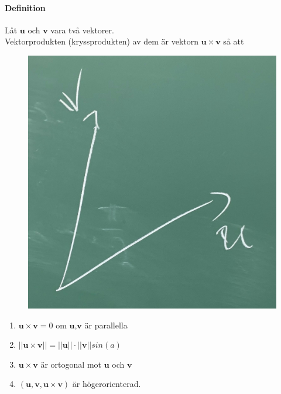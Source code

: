 \paragraph{Definition} Låt $\bm{u}$ och $\bm{v}$ vara två vektorer.\\
Vektorprodukten (kryssprodukten) av dem är vektorn $\bm{u}\times \bm{v}$ så att
\begin{figure}
    \vspace{-10pt}
    \centering
    \includegraphics[scale=0.07]{imgs/22-01-20-img09.jpg}
\end{figure}
\vspace{-10pt}
\begin{enumerate}
    \item $\bm{u}\times \bm{v} = 0$ om $\bm{u}$,$\bm{v}$ är parallella
    \item $||\bm{u}\times \bm{v}||=||\bm{u}||\cdot ||\bm{v}||sin(a)$
    \item $\bm{u}\times \bm{v}$ är ortogonal mot $\bm{u}$ och $\bm{v}$
    \item $(\bm{u},\bm{v}, \bm{u}\times \bm{v})$ är högerorienterad.
\end{enumerate}
